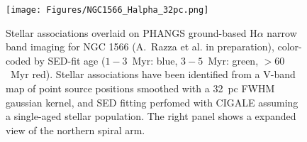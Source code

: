 \begin{figure}
\texttt{[image: Figures/NGC1566\_Halpha\_32pc.png]}
 \caption{Stellar associations overlaid on PHANGS ground-based H$\alpha$ narrow band imaging for NGC 1566 (A.~Razza et al. in preparation), color-coded by SED-fit age ($1{-}3$~Myr: blue, $3{-}5$~Myr: green, ${>}60$~Myr red).  Stellar associations have been identified from a V-band map of point source positions smoothed with a 32~pc FWHM gaussian kernel, and SED fitting perfomed with CIGALE assuming a single-aged stellar population.  The right panel shows a expanded view of the northern spiral arm.}
 \label{fig:ngc1566_nuv_v_regions_alma}
\end{figure}